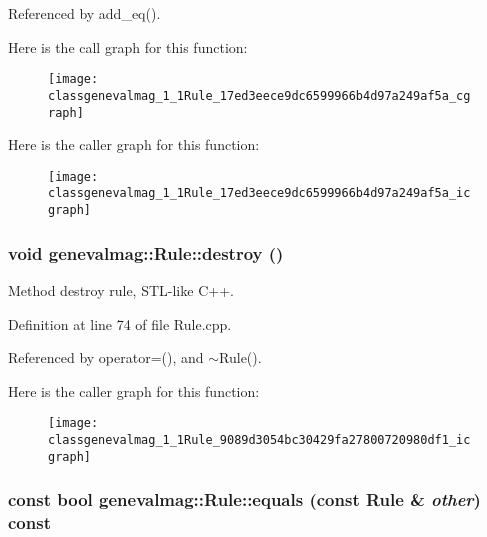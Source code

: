 Referenced by add\_\-eq().

Here is the call graph for this function:\nopagebreak
\begin{figure}[H]
\begin{center}
\leavevmode
\texttt{[image: classgenevalmag\_1\_1Rule\_17ed3eece9dc6599966b4d97a249af5a\_cgraph]}
\end{center}
\end{figure}


Here is the caller graph for this function:\nopagebreak
\begin{figure}[H]
\begin{center}
\leavevmode
\texttt{[image: classgenevalmag\_1\_1Rule\_17ed3eece9dc6599966b4d97a249af5a\_icgraph]}
\end{center}
\end{figure}
\hypertarget{classgenevalmag_1_1Rule_9089d3054bc30429fa27800720980df1}{
\subsubsection[{destroy}]{\setlength{\rightskip}{0pt plus 5cm}void genevalmag::Rule::destroy ()}}
\label{classgenevalmag_1_1Rule_9089d3054bc30429fa27800720980df1}


Method destroy rule, STL-like C++. 

Definition at line 74 of file Rule.cpp.

Referenced by operator=(), and $\sim$Rule().

Here is the caller graph for this function:\nopagebreak
\begin{figure}[H]
\begin{center}
\leavevmode
\texttt{[image: classgenevalmag\_1\_1Rule\_9089d3054bc30429fa27800720980df1\_icgraph]}
\end{center}
\end{figure}
\hypertarget{classgenevalmag_1_1Rule_3e625589d6f1d8575c625a60d1dd210c}{
\subsubsection[{equals}]{\setlength{\rightskip}{0pt plus 5cm}const bool genevalmag::Rule::equals (const {\bf Rule} \& {\em other}) const}}
\label{classgenevalmag_1_1Rule_3e625589d6f1d8575c625a60d1dd210c}


